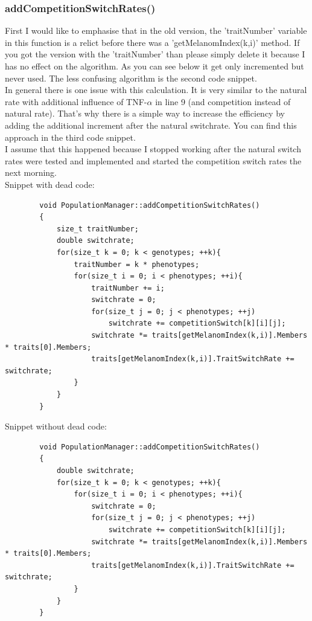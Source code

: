 \documentclass[a4paper,10pt]{scrartcl}
\begin{document}
		\subsubsection{addCompetitionSwitchRates()}\label{subsubsec:addCompSwitch}
		First I would like to emphasise that in the old version, the 'traitNumber' variable in this function is a relict before there was a 'getMelanomIndex(k,i)' method. If you got the version with the 'traitNumber' than please simply delete it because I has no effect on the algorithm. As you can see below it get only incremented but never used. The less confusing algorithm is the second code snippet.\\
		In general there is one issue with this calculation. It is very similar to the natural rate with additional influence of TNF-$ \alpha $ in line 9 (and competition instead of natural rate). That's why there is a simple way to increase the efficiency by adding the additional increment after the natural switchrate. You can find this approach in the third code snippet.\\
		I assume that this happened because I stopped working after the natural switch rates were tested and implemented and started the competition switch rates the next morning.\\
		Snippet with dead code:
		\begin{lstlisting}
		void PopulationManager::addCompetitionSwitchRates()
		{
		    size_t traitNumber;
		    double switchrate;
		    for(size_t k = 0; k < genotypes; ++k){
		        traitNumber = k * phenotypes;
		        for(size_t i = 0; i < phenotypes; ++i){
		            traitNumber += i;
		            switchrate = 0;
		            for(size_t j = 0; j < phenotypes; ++j)
		                switchrate += competitionSwitch[k][i][j];
		            switchrate *= traits[getMelanomIndex(k,i)].Members * traits[0].Members;
		            traits[getMelanomIndex(k,i)].TraitSwitchRate += switchrate;
		        }
		    }
		}
		\end{lstlisting}
		Snippet without dead code:
		\begin{lstlisting}
		void PopulationManager::addCompetitionSwitchRates()
		{
		    double switchrate;
		    for(size_t k = 0; k < genotypes; ++k){
		        for(size_t i = 0; i < phenotypes; ++i){
		            switchrate = 0;
		            for(size_t j = 0; j < phenotypes; ++j)
		                switchrate += competitionSwitch[k][i][j];
		            switchrate *= traits[getMelanomIndex(k,i)].Members * traits[0].Members;
		            traits[getMelanomIndex(k,i)].TraitSwitchRate += switchrate;
		        }
		    }
		}
		\end{lstlisting}
\end{document}

